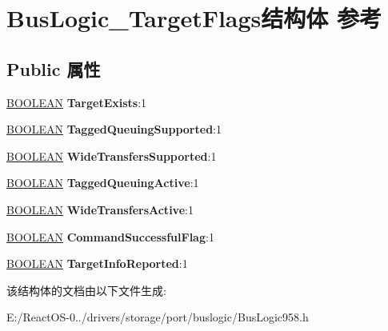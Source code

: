 \hypertarget{struct_bus_logic___target_flags}{}\section{Bus\+Logic\+\_\+\+Target\+Flags结构体 参考}
\label{struct_bus_logic___target_flags}
\subsection*{Public 属性}
\begin{DoxyCompactItemize}
\item 
\mbox{\label{struct_bus_logic___target_flags_a9974a7302e61e7a578eedd6e2a320b55}} 
\hyperlink{_processor_bind_8h_a112e3146cb38b6ee95e64d85842e380a}{B\+O\+O\+L\+E\+AN} {\bfseries Target\+Exists}\+:1
\item 
\mbox{\label{struct_bus_logic___target_flags_ad6d775b2b9a97cb24a1a22b138c14df3}} 
\hyperlink{_processor_bind_8h_a112e3146cb38b6ee95e64d85842e380a}{B\+O\+O\+L\+E\+AN} {\bfseries Tagged\+Queuing\+Supported}\+:1
\item 
\mbox{\label{struct_bus_logic___target_flags_a237765299e254438550a27e5e8580974}} 
\hyperlink{_processor_bind_8h_a112e3146cb38b6ee95e64d85842e380a}{B\+O\+O\+L\+E\+AN} {\bfseries Wide\+Transfers\+Supported}\+:1
\item 
\mbox{\label{struct_bus_logic___target_flags_a1d3be5f5cbc295f0e1b26271f89cfb0d}} 
\hyperlink{_processor_bind_8h_a112e3146cb38b6ee95e64d85842e380a}{B\+O\+O\+L\+E\+AN} {\bfseries Tagged\+Queuing\+Active}\+:1
\item 
\mbox{\label{struct_bus_logic___target_flags_a1cd0cbd6f03d3c43ed11be33e912f0a1}} 
\hyperlink{_processor_bind_8h_a112e3146cb38b6ee95e64d85842e380a}{B\+O\+O\+L\+E\+AN} {\bfseries Wide\+Transfers\+Active}\+:1
\item 
\mbox{\label{struct_bus_logic___target_flags_a4109572039b7ba0ac1f4126ff91f4235}} 
\hyperlink{_processor_bind_8h_a112e3146cb38b6ee95e64d85842e380a}{B\+O\+O\+L\+E\+AN} {\bfseries Command\+Successful\+Flag}\+:1
\item 
\mbox{\label{struct_bus_logic___target_flags_a784fd1336b441df590ae60a71473327c}} 
\hyperlink{_processor_bind_8h_a112e3146cb38b6ee95e64d85842e380a}{B\+O\+O\+L\+E\+AN} {\bfseries Target\+Info\+Reported}\+:1
\end{DoxyCompactItemize}


该结构体的文档由以下文件生成\+:\begin{DoxyCompactItemize}
\item 
E\+:/\+React\+O\+S-\/0../drivers/storage/port/buslogic/Bus\+Logic958.\+h\end{DoxyCompactItemize}
